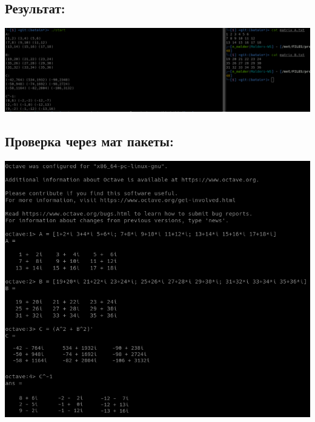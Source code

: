 \documentclass[a4paper]{article}
\begin{document}
\subsection{Результат:}
\includegraphics[width=1\textwidth]{3.png}
\subsection{Проверка через мат пакеты:}
\includegraphics[width=1\textwidth]{check.png}
\end{document}
